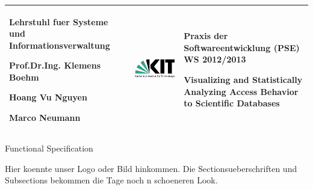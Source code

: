 \begin{titlepage}

\vspace*{-3cm}
\begin{center}

\begin{tabular}{m{5.5cm} m{5cm} m{5.5cm}}
\arrayrulecolor{PineGreen!90}

\begin{center}
\footnotesize{
\textbf{ Lehrstuhl fuer Systeme und Informationsverwaltung}
\newline

Prof.Dr.Ing. Klemens Boehm

Hoang Vu Nguyen

Marco Neumann
} 	
\end{center}
   & 
\begin{center}

   \includegraphics[width=0.9\linewidth]{Pictures/KIT-Logo.png}
   
\end{center}   
   & 
\begin{center}
\footnotesize{
\textbf{Praxis der Softwareentwicklung (PSE)}\newline
WS 2012/2013\newline

Visualizing and Statistically Analyzing Access Behavior to Scientific Databases
}
\end{center}\\
\hline
 
\end{tabular}


\vspace*{6cm}

\Huge
Functional Specification

\vspace*{2cm}
\normalsize
 Hier koennte unser Logo oder Bild hinkommen. Die Sectionsueberschriften und Subsections bekommen
 die Tage noch n schoeneren Look. 



\end{center}
\end{titlepage}
